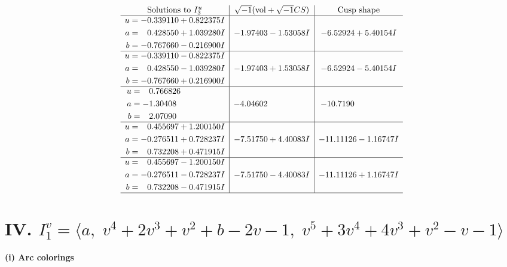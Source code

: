 \documentclass[1p]{elsarticle_modified}
\theoremstyle{definition}
\newcommand{\I}{\sqrt{-1}}
\begin{document}
$$\begin{array}{c|c|c}  
\text{Solutions to }I^u_{3}& \I (\text{vol} + \sqrt{-1}CS) & \text{Cusp shape}\\
 \hline 
\begin{aligned}
u &= -0.339110 + 0.822375 I \\
a &= \phantom{-}0.428550 + 1.039280 I \\
b &= -0.767660 - 0.216900 I\end{aligned}
 & -1.97403 - 1.53058 I & -6.52924 + 5.40154 I \\ \hline\begin{aligned}
u &= -0.339110 - 0.822375 I \\
a &= \phantom{-}0.428550 - 1.039280 I \\
b &= -0.767660 + 0.216900 I\end{aligned}
 & -1.97403 + 1.53058 I & -6.52924 - 5.40154 I \\ \hline\begin{aligned}
u &= \phantom{-}0.766826\phantom{ +0.000000I} \\
a &= -1.30408\phantom{ +0.000000I} \\
b &= \phantom{-}2.07090\phantom{ +0.000000I}\end{aligned}
 & -4.04602\phantom{ +0.000000I} & -10.7190\phantom{ +0.000000I} \\ \hline\begin{aligned}
u &= \phantom{-}0.455697 + 1.200150 I \\
a &= -0.276511 + 0.728237 I \\
b &= \phantom{-}0.732208 + 0.471915 I\end{aligned}
 & -7.51750 + 4.40083 I & -11.11126 - 1.16747 I \\ \hline\begin{aligned}
u &= \phantom{-}0.455697 - 1.200150 I \\
a &= -0.276511 - 0.728237 I \\
b &= \phantom{-}0.732208 - 0.471915 I\end{aligned}
 & -7.51750 - 4.40083 I & -11.11126 + 1.16747 I\\
 \hline 
 \end{array}$$\newpage\newpage\renewcommand{\arraystretch}{1}
\centering \section*{IV. $I^v_{1}= \langle a,\;v^4+2 v^3+v^2+b-2 v-1,\;v^5+3 v^4+4 v^3+v^2- v-1 \rangle$}
\flushleft \textbf{(i) Arc colorings}\\
\end{document}

